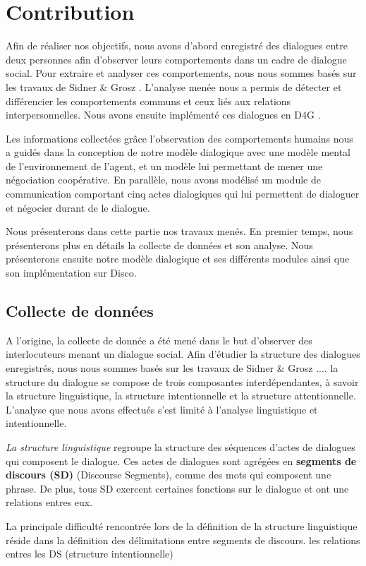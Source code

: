 \documentclass[a4paper,french]{article}
\begin{document}
\section{Contribution}
\label{contribution}

\par Afin de réaliser nos objectifs, nous avons d'abord enregistré des dialogues entre deux personnes afin d'observer leurs comportements dans un cadre de dialogue social. 
Pour extraire et analyser ces comportements, nous nous sommes basés sur les travaux de Sidner \& Grosz \cite{grosz1986attention}. L'analyse menée nous a permis de détecter et différencier les comportements communs et ceux liés aux relations interpersonnelles. Nous avons ensuite implémenté ces dialogues en D4G \cite{rich}. 
\par Les informations collectées grâce l'observation des comportements humains nous a guidés dans la conception de notre modèle dialogique avec une modèle mental de l'environnement de l'agent, et un modèle lui permettant de mener une négociation coopérative. 
En parallèle, nous avons modélisé un module de communication comportant cinq actes dialogiques qui lui permettent de dialoguer et négocier durant de le dialogue. 
\par Nous présenterons dans cette partie nos travaux menés. En premier temps, nous présenterons plus en détails la collecte de données et son analyse. 
	Nous présenterons ensuite notre modèle dialogique et ses différents modules ainsi que son implémentation sur Disco. 
\subsection{Collecte de données}
\par A l'origine, la collecte de donnée a été mené dans le but d'observer des interlocuteurs menant un dialogue social. Afin d'étudier la structure des dialogues enregistrés, nous nous sommes basés sur les travaux de Sidner \& Grosz \cite{grosz1986attention}  ....  la structure du dialogue se compose de trois composantes interdépendantes, à savoir la structure linguistique, la structure intentionnelle et la structure attentionnelle. L'analyse que nous avons effectués s'est limité à l'analyse linguistique et intentionnelle. 
\par \textit{La structure linguistique} regroupe la structure des séquences d'actes de dialogues qui composent le dialogue. Ces actes de dialogues sont agrégées en \textbf{ segments de discours (SD)} (Discourse Segments), comme des mots qui composent une phrase. De plus, tous SD exercent certaines fonctions sur le dialogue et ont une relations entres eux.  
\par La principale difficulté rencontrée lors de la définition de la structure linguistique réside dans la définition des délimitations entre segments de discours. 
les relations entres les DS (structure intentionnelle)
\end{document}
